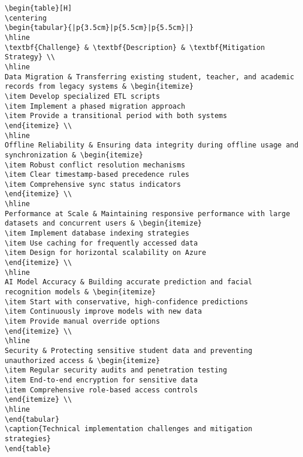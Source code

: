 \documentclass[11pt]{report}
\begin{document}
\begin{verbatim}
\begin{table}[H]
\centering
\begin{tabular}{|p{3.5cm}|p{5.5cm}|p{5.5cm}|}
\hline
\textbf{Challenge} & \textbf{Description} & \textbf{Mitigation Strategy} \\
\hline
Data Migration & Transferring existing student, teacher, and academic records from legacy systems & \begin{itemize}
\item Develop specialized ETL scripts
\item Implement a phased migration approach
\item Provide a transitional period with both systems
\end{itemize} \\
\hline
Offline Reliability & Ensuring data integrity during offline usage and synchronization & \begin{itemize}
\item Robust conflict resolution mechanisms
\item Clear timestamp-based precedence rules
\item Comprehensive sync status indicators
\end{itemize} \\
\hline
Performance at Scale & Maintaining responsive performance with large datasets and concurrent users & \begin{itemize}
\item Implement database indexing strategies
\item Use caching for frequently accessed data
\item Design for horizontal scalability on Azure
\end{itemize} \\
\hline
AI Model Accuracy & Building accurate prediction and facial recognition models & \begin{itemize}
\item Start with conservative, high-confidence predictions
\item Continuously improve models with new data
\item Provide manual override options
\end{itemize} \\
\hline
Security & Protecting sensitive student data and preventing unauthorized access & \begin{itemize}
\item Regular security audits and penetration testing
\item End-to-end encryption for sensitive data
\item Comprehensive role-based access controls
\end{itemize} \\
\hline
\end{tabular}
\caption{Technical implementation challenges and mitigation strategies}
\end{table}


\end{verbatim}
\end{document}

